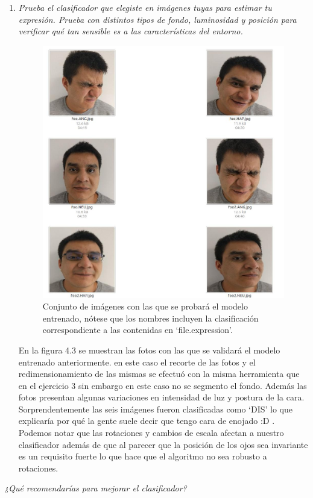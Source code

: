 \documentclass[paper=letter, fontsize=11pt]{scrartcl}
\numberwithin{equation}{section} %
\numberwithin{figure}{section} %
\numberwithin{table}{section} %
\begin{document}
\begin{enumerate}
\item  \textit{Prueba el clasificador que elegiste en imágenes tuyas para estimar tu expresión. Prueba con distintos tipos de fondo, luminosidad y posición para verificar qué tan sensible es a las características del entorno.}\\
\begin{figure}[H]
  \begin{center}
    \includegraphics[scale =.3]{fotos.jpg}
    \caption{Conjunto de imágenes con las que se probará el modelo entrenado, nótese que los nombres incluyen la clasificación correspondiente a las contenidas en ‘file.expression’.}
    \label{figura4_3}
  \end{center}
\end{figure}

En la figura 4.3 se muestran las fotos con las que se validará el modelo entrenado anteriormente. en este caso el recorte de las fotos y el redimensionamiento de las mismas se efectuó con la misma herramienta que en el ejercicio 3 sin embargo en este caso no se segmento el fondo. Además las fotos presentan algunas variaciones en intensidad de luz y postura de la cara.\\
Sorprendentemente las seis imágenes fueron clasificadas como ‘DIS’ lo que explicaría por qué la gente suele decir que tengo cara de enojado :D . Podemos notar que las rotaciones y cambios de escala afectan a nuestro clasificador además de que al parecer que la posición de los ojos sea invariante es un requisito fuerte lo que hace que el algoritmo no sea robusto a rotaciones. 





\end{enumerate}
\textit{¿Qué recomendarías para mejorar el clasificador?}\\
\end{document}
